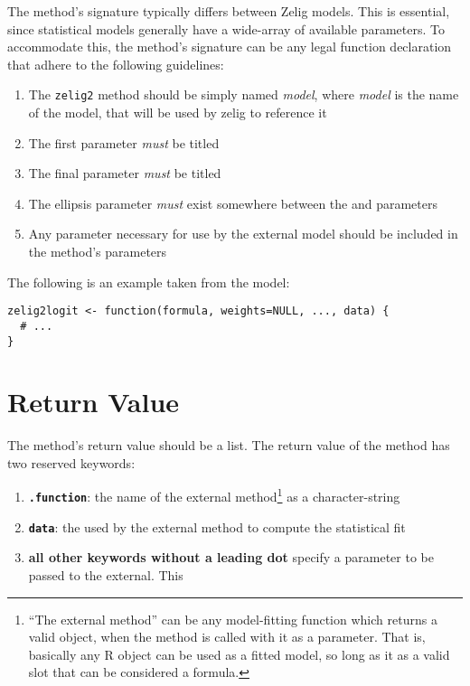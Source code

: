 The  method's signature typically differs between Zelig models. This is essential, since statistical models generally have a wide-array of available parameters. To accommodate this, the  method's signature can be any legal function declaration that adhere to the following guidelines:

\begin{enumerate}
  \item The {\tt zelig2} method should be simply named \emph{model}, where \emph{model} is the name of the model, that will be used by zelig to reference it
	\item The first parameter \emph{must} be titled 
	\item The final parameter \emph{must} be titled 
	\item The ellipsis parameter \emph{must} exist somewhere between the  and  parameters
  \item Any parameter necessary for use by the external model should be included in the method's parameters
\end{enumerate}

{\noindent The following is an example taken from the  model:}

\begin{verbatim}
zelig2logit <- function(formula, weights=NULL, ..., data) {
  # ...
}
\end{verbatim}



\section{ Return Value}
\label{section:zelig2-return-value}

The  method's return value should be a list. The return value of the  method has two reserved keywords:


\begin{enumerate}
	\item {\bf\tt .function}: the name of the external method\footnote{``The external method'' can be any model-fitting function which returns a valid  object, when the  method is called with it as a parameter. That is, basically any R object can be used as a fitted model, so long as it as a valid slot that can be considered a formula.} as a character-string
	\item {\bf \tt data}: the  used by the external method to compute the statistical fit
	\item {\bf all other keywords without a leading dot} specify a parameter to be passed to the external. This 
\end{enumerate}

